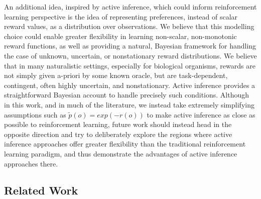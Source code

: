 An additional idea, inspired by active inference, which could inform reinforcement learning perspective is the idea of representing preferences, instead of scalar reward values, as a distribution over observations. We believe that this modelling choice could enable greater flexibility in learning non-scalar, non-monotonic reward functions, as well as providing a natural, Bayesian framework for handling the case of unknown, uncertain, or nonstationary reward distributions. We believe that in many naturalistic settings, especially for biological organisms, rewards are not simply given a-priori by some known oracle, but are task-dependent, contingent, often highly uncertain, and nonstationary. Active inference provides a straightforward Bayesian account to handle precisely such conditions. Although in this work, and in much of the literature, we instead take extremely simplifying assumptions such as $\tilde{p}(o) = exp(-r(o))$ to make active inference as close as possible to reinforcement learning, future work should instead head in the opposite direction and try to deliberately explore the regions where active inference approaches offer greater flexibility than the traditional reinforcement learning paradigm, and thus demonstrate the advantages of active inference approaches there.


\subsection{Related Work}

